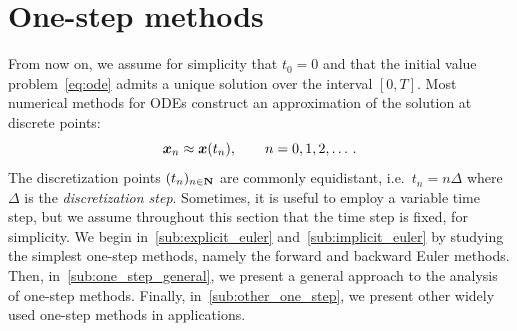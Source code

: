 
\section{One-step methods}
\label{sec:one-step_methods}
From now on, we assume for simplicity that $t_0 = 0$ and that
the initial value problem~\eqref{eq:ode} admits a unique solution over the interval $[0, T]$.
Most numerical methods for ODEs construct an approximation of the solution at discrete points:
\[
    \mathbf{\boldsymbol{x}}_n \approx \mathbf{\boldsymbol{x}}(t_n), \qquad n = 0, 1, 2, \dotsc.
\]
The discretization points $(t_n)_{n \in \mathbf N}$ are commonly equidistant,
i.e.~$t_n = n \Delta$ where $\Delta$ is the \emph{discretization step}.
Sometimes, it is useful to employ a variable time step,
but we assume throughout this section that the time step is fixed, for simplicity.
We begin in~\cref{sub:explicit_euler} and~\cref{sub:implicit_euler} by studying the simplest one-step methods,
namely the forward and backward Euler methods.
Then, in~\cref{sub:one_step_general},
we present a general approach to the analysis of one-step methods.
Finally, in~\cref{sub:other_one_step},
we present other widely used one-step methods in applications.

